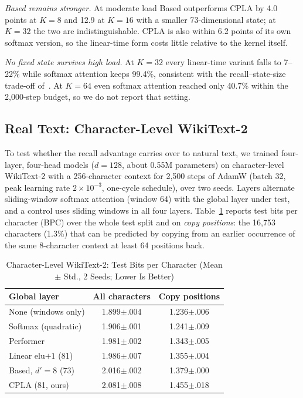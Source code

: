\documentclass[conference]{IEEEtran}
\theoremstyle{definition}
\newcommand{\cpla}{CPLA}
\begin{document}
\textit{Based remains stronger.} At moderate load Based outperforms \cpla{} by 4.0 points at $K=8$ and 12.9 at $K=16$ with a smaller 73-dimensional state; at $K=32$ the two are indistinguishable. \cpla{} is also within 6.2 points of its own softmax version, so the linear-time form costs little relative to the kernel itself.

\textit{No fixed state survives high load.} At $K=32$ every linear-time variant falls to 7--22\% while softmax attention keeps 99.4\%, consistent with the recall--state-size trade-off of~\cite{arora2024zoology,arora2024based}. At $K=64$ even softmax attention reached only 40.7\% within the 2{,}000-step budget, so we do not report that setting.


\subsection{Real Text: Character-Level WikiText-2}
To test whether the recall advantage carries over to natural text, we trained four-layer, four-head models ($d=128$, about 0.55M parameters) on character-level WikiText-2 with a 256-character context for 2{,}500 steps of AdamW (batch 32, peak learning rate $2\times10^{-3}$, one-cycle schedule), over two seeds. Layers alternate sliding-window softmax attention (window 64) with the global layer under test, and a control uses sliding windows in all four layers. Table~\ref{tab:lm} reports test bits per character (BPC) over the whole test split and on \emph{copy positions}: the 16{,}753 characters (1.3\%) that can be predicted by copying from an earlier occurrence of the same 8-character context at least 64 positions back.

\begin{table}[t]
\caption{Character-Level WikiText-2: Test Bits per Character (Mean $\pm$ Std., 2 Seeds; Lower Is Better)}
\label{tab:lm}
\centering
\setlength{\tabcolsep}{4pt}
\begin{tabular}{@{}lcc@{}}
\toprule
Global layer & All characters & Copy positions \\
\midrule
None (windows only)     & 1.899$\pm$.004 & 1.236$\pm$.006 \\
Softmax (quadratic)     & 1.906$\pm$.001 & 1.241$\pm$.009 \\
Performer               & 1.981$\pm$.002 & 1.343$\pm$.005 \\
Linear elu$+1$ (81)     & 1.986$\pm$.007 & 1.355$\pm$.004 \\
Based, $d'{=}8$ (73)    & 2.016$\pm$.002 & 1.379$\pm$.000 \\
\cpla{} (81, ours)      & 2.081$\pm$.008 & 1.455$\pm$.018 \\
\bottomrule
\end{tabular}
\end{table}
\end{document}
